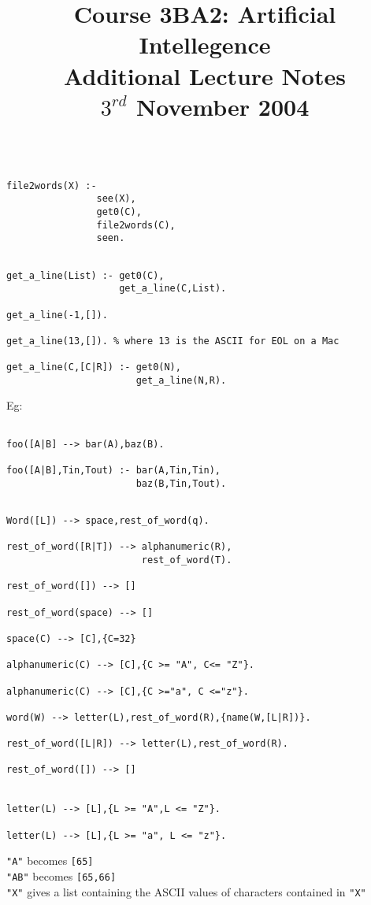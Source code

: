 \documentclass[a4paper,12pt]{article}
\begin{document}
\title{Course 3BA2: Artificial Intellegence \\ Additional Lecture Notes \\ $3^{rd}$ November 2004}

\maketitle

\begin{verbatim}

file2words(X) :-
                see(X),
                get0(C),
                file2words(C),
                seen.

\end{verbatim}

\begin{verbatim}

get_a_line(List) :- get0(C),
                    get_a_line(C,List).

get_a_line(-1,[]).

get_a_line(13,[]). % where 13 is the ASCII for EOL on a Mac 

get_a_line(C,[C|R]) :- get0(N),
                       get_a_line(N,R).

\end{verbatim}

Eg:

\begin{verbatim}

foo([A|B] --> bar(A),baz(B).

foo([A|B],Tin,Tout) :- bar(A,Tin,Tin),
                       baz(B,Tin,Tout).

\end{verbatim}

\begin{verbatim}

Word([L]) --> space,rest_of_word(q).

rest_of_word([R|T]) --> alphanumeric(R),
                        rest_of_word(T).

rest_of_word([]) --> []

rest_of_word(space) --> []

space(C) --> [C],{C=32}

alphanumeric(C) --> [C],{C >= "A", C<= "Z"}.

alphanumeric(C) --> [C],{C >="a", C <="z"}.

word(W) --> letter(L),rest_of_word(R),{name(W,[L|R])}.

rest_of_word([L|R]) --> letter(L),rest_of_word(R).

rest_of_word([]) --> []


letter(L) --> [L],{L >= "A",L <= "Z"}.

letter(L) --> [L],{L >= "a", L <= "z"}.

\end{verbatim}

\verb!"A"! becomes \verb![65]! \\
\verb!"AB"! becomes \verb![65,66]! \\
\verb!"X"! gives a list containing the ASCII values of characters
contained in \verb!"X"!
\end{document}
